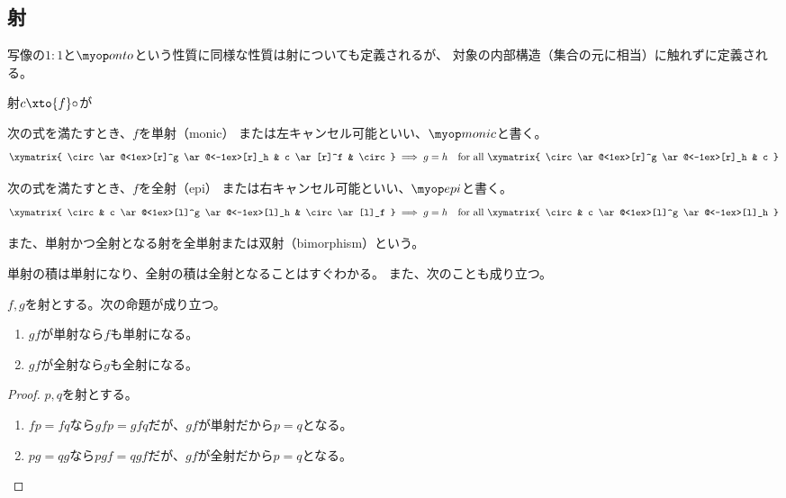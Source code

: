 \subsection{射}\label{s2:射} %
	写像の$1:1$と$\onto$という性質に同様な性質は射についても定義されるが、
	対象の内部構造（集合の元に相当）に触れずに定義される。

	\begin{definition}[単射と全射]\label{def:単射と全射} %
		射$c\xto{f}\circ$が
		\begin{description}\setlength{\itemsep}{-1mm} %
			\item[単射] 次の式を満たすとき、$f$を単射（monic）
			または左キャンセル可能といい、$\monic$と書く。
			\begin{equation*}\begin{split} %
				\xymatrix{
					\circ \ar@<1ex>[r]^g \ar@<-1ex>[r]_h & c \ar[r]^f & \circ
				} \implies g = h \quad\text{for all }\xymatrix{
					\circ \ar@<1ex>[r]^g \ar@<-1ex>[r]_h & c
				}
			\end{split}\end{equation*} %
			\item[全射] 次の式を満たすとき、$f$を全射（epi）
			または右キャンセル可能といい、$\epi$と書く。
			\begin{equation*}\begin{split} %
				\xymatrix{
					\circ & c \ar@<1ex>[l]^g \ar@<-1ex>[l]_h & \circ \ar[l]_f
				} \implies g = h \quad\text{for all }\xymatrix{
					\circ & c \ar@<1ex>[l]^g \ar@<-1ex>[l]_h
				}
			\end{split}\end{equation*} %
		\end{description} %
		また、単射かつ全射となる射を全単射または双射（bimorphism）という。
	\end{definition} %

	単射の積は単射になり、全射の積は全射となることはすぐわかる。
	また、次のことも成り立つ。

	\begin{proposition}[積の単射と全射]\label{prop:積の単射と全射} %
		$f,g$を射とする。次の命題が成り立つ。
		\begin{enumerate}\setlength{\itemsep}{-1mm} %
			\item $gf$が単射なら$f$も単射になる。
			\item $gf$が全射なら$g$も全射になる。
		\end{enumerate} %
	\end{proposition} %
	\begin{proof} %
		$p,q$を射とする。
		\begin{enumerate}\setlength{\itemsep}{-1mm} %
			\item $fp=fq$なら$gfp=gfq$だが、$gf$が単射だから$p=q$となる。
			\item $pg=qg$なら$pgf=qgf$だが、$gf$が全射だから$p=q$となる。
		\end{enumerate} %
	\end{proof} %

